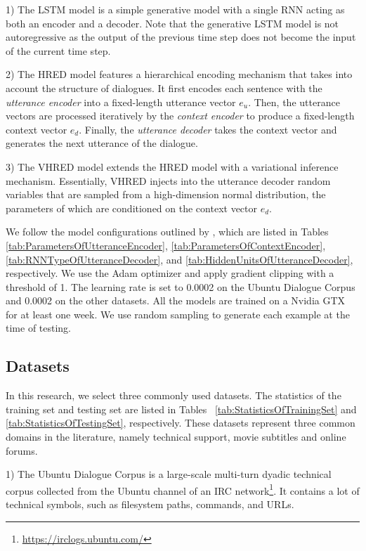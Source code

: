 \documentclass[conference]{IEEEtran}
\begin{document}
1) The LSTM model is a simple generative model with a single RNN acting as both an encoder and a decoder.
Note that the generative LSTM model is not autoregressive as the output of the previous time step does not become the input of the current time step.

2) The HRED model \cite{hred-qs} features a hierarchical encoding mechanism that takes into account the structure of dialogues.
It first encodes each sentence with the \emph{utterance encoder} into a fixed-length utterance vector $e_u$. Then, the utterance vectors are processed iteratively by the \emph{context encoder} to produce a fixed-length context vector $e_d$.
Finally, the \emph{utterance decoder} takes the context vector and generates the next utterance of the dialogue.

3) The VHRED model \cite{VHRED} extends the HRED model with a variational inference mechanism.
Essentially, VHRED injects into the utterance decoder random variables that are sampled from a high-dimension normal distribution, the parameters of which are conditioned on the context vector $e_d$.

We follow the model configurations outlined by \cite{VHRED}, which are listed in Tables~
\ref{tab:ParametersOfUtteranceEncoder},
\ref{tab:ParametersOfContextEncoder},
\ref{tab:RNNTypeOfUtteranceDecoder}, and
\ref{tab:HiddenUnitsOfUtteranceDecoder},
respectively.
We use the Adam optimizer \cite{AdamOpt} and apply gradient clipping with a threshold of 1.
The learning rate is set to 0.0002 on the Ubuntu Dialogue Corpus and 0.0002 on the other datasets.
All the models are trained on a Nvidia GTX for at least one week.
We use random sampling to generate each example at the time of testing.


\subsection{Datasets}
In this research, we select three commonly used datasets.
The statistics of the training set and testing set are listed in Tables~
\ref{tab:StatisticsOfTrainingSet} and
\ref{tab:StatisticsOfTestingSet}, respectively.
These datasets represent three common domains in the literature, namely technical support, movie subtitles and online forums.


1) The Ubuntu Dialogue Corpus \cite{ubuntu_corpus} is a large-scale multi-turn dyadic technical corpus collected from the Ubuntu channel of an IRC network\footnote{\url{https://irclogs.ubuntu.com/}}.
It contains a lot of technical symbols, such as filesystem paths, commands, and URLs.
\end{document}
